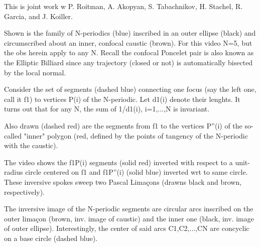 This is joint work w P. Roitman, A. Akopyan, S. Tabachnikov, H. Stachel, R. Garcia, and J. Koiller.

Shown is the family of N-periodics (blue) inscribed in an outer ellipse (black) and circumscribed about an inner, confocal caustic (brown). For this video N=5, but the obs herein apply to any N. Recall the confocal Poncelet pair is also known as the Elliptic Billiard since any trajectory (closed or not) is automatically bisected by the local normal.

Consider the set of segments (dashed blue) connecting one focus (say the left one, call it f1) to vertices P(i) of the N-periodic. Let d1(i) denote their lenghts. It turns out that for any N, the sum of 1/d1(i), i=1,...,N is invariant. 

Also drawn (dashed red) are the segments from f1 to the vertices P''(i) of the so-called "inner" polygon (red, defined by the points of tangency of the N-periodic with the caustic). 

The video shows the f1P(i) segments (solid red) inverted with respect to a unit-radius circle centered on f1 and f1P''(i) (solid blue) inverted wrt to same circle. These inversive spokes sweep two Pascal Limaçons (drawns black and brown, respectively). 

The inversive image of the N-periodic segments are circular arcs inscribed on the outer limaçon (brown, inv. image of caustic) and the inner one (black, inv. image of outer ellipse). Interestingly, the center of said arcs C1,C2,...,CN are concyclic on a base circle (dashed blue).